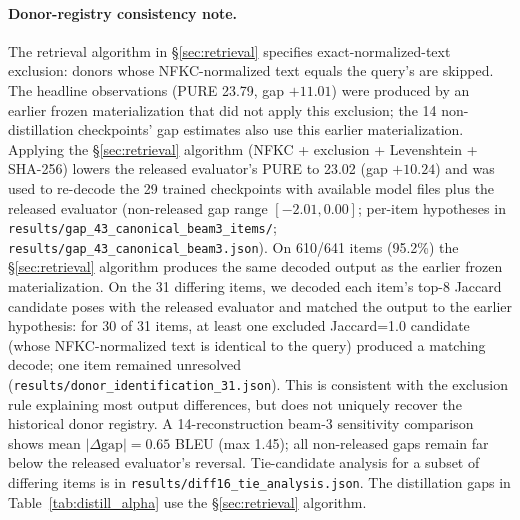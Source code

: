 \documentclass[pdflatex,sn-chicago]{sn-jnl}
\begin{document}
\paragraph{Donor-registry consistency note.}
\label{sec:retrieval_note}
The retrieval algorithm in \S\ref{sec:retrieval} specifies exact-normalized-text exclusion: donors whose NFKC-normalized text equals the query's are skipped. The headline observations (PURE 23.79, gap $+11.01$) were produced by an earlier frozen materialization that did not apply this exclusion; the 14 non-distillation checkpoints' gap estimates also use this earlier materialization. Applying the \S\ref{sec:retrieval} algorithm (NFKC + exclusion + Levenshtein + SHA-256) lowers the released evaluator's PURE to 23.02 (gap $+10.24$) and was used to re-decode the 29 trained checkpoints with available model files plus the released evaluator (non-released gap range $[-2.01, 0.00]$; per-item hypotheses in \texttt{results/gap\_43\_canonical\_beam3\_items/}; \texttt{results/gap\_43\_canonical\_beam3.json}). On 610/641 items (95.2\%) the \S\ref{sec:retrieval} algorithm produces the same decoded output as the earlier frozen materialization. On the 31 differing items, we decoded each item's top-8 Jaccard candidate poses with the released evaluator and matched the output to the earlier hypothesis: for 30 of 31 items, at least one excluded Jaccard=1.0 candidate (whose NFKC-normalized text is identical to the query) produced a matching decode; one item remained unresolved (\texttt{results/donor\_identification\_31.json}). This is consistent with the exclusion rule explaining most output differences, but does not uniquely recover the historical donor registry. A 14-reconstruction beam-3 sensitivity comparison shows mean $|\Delta\text{gap}| = 0.65$ BLEU (max 1.45); all non-released gaps remain far below the released evaluator's reversal. Tie-candidate analysis for a subset of differing items is in \texttt{results/diff16\_tie\_analysis.json}. The distillation gaps in Table~\ref{tab:distill_alpha} use the \S\ref{sec:retrieval} algorithm.
\end{document}
